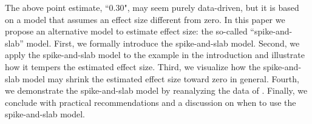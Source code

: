 \documentclass[a4paper]{article}
\newenvironment{revision2}{\color{teal}}{\color{black}}
\begin{document}
\begin{revision2}
The above point estimate, ``0.30", may seem purely data-driven, but it is based on a model that assumes an effect size different from zero. In this paper we propose an alternative model to estimate effect size:\end{revision2} the so-called ``spike-and-slab'' model. First, we formally introduce the spike-and-slab model.
Second, we apply the spike-and-slab model to the example in the introduction and illustrate how it tempers the estimated effect size.
Third, we visualize how the spike-and-slab model may shrink the estimated effect size toward zero in general.
Fourth, we demonstrate the spike-and-slab model by reanalyzing the data of \textcite{heycke2018two}.
Finally, we conclude with practical recommendations and a discussion on when to use the spike-and-slab model.
\end{document}
